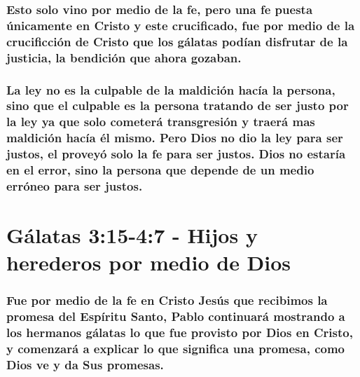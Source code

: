 \documentclass[11a pt,twoside]{article}
\let\oldsection\section
\renewcommand{\section}{\needspace{6\baselineskip}\oldsection}
\let\oldsubsubsection\subsubsection
\renewcommand{\subsubsection}{\needspace{4\baselineskip}\oldsubsubsection}
\begin{document}
\subsubsection{Esto solo vino por medio de la fe, pero una fe puesta
únicamente en Cristo y este crucificado, fue por medio de la
crucificción de Cristo que los gálatas podían disfrutar de la justicia,
la bendición que ahora
gozaban.}\label{esto-solo-vino-por-medio-de-la-fe-pero-una-fe-puesta-uxfanicamente-en-cristo-y-este-crucificado-fue-por-medio-de-la-crucificciuxf3n-de-cristo-que-los-guxe1latas-poduxedan-disfrutar-de-la-justicia-la-bendiciuxf3n-que-ahora-gozaban.}

\subsubsection{La ley no es la culpable de la maldición hacía la
persona, sino que el culpable es la persona tratando de ser justo por la
ley ya que solo cometerá transgresión y traerá mas maldición hacía él
mismo. Pero Dios no dio la ley para ser justos, el proveyó solo la fe
para ser justos. Dios no estaría en el error, sino la persona que
depende de un medio erróneo para ser
justos.}\label{la-ley-no-es-la-culpable-de-la-maldiciuxf3n-hacuxeda-la-persona-sino-que-el-culpable-es-la-persona-tratando-de-ser-justo-por-la-ley-ya-que-solo-cometeruxe1-transgresiuxf3n-y-traeruxe1-mas-maldiciuxf3n-hacuxeda-uxe9l-mismo.-pero-dios-no-dio-la-ley-para-ser-justos-el-proveyuxf3-solo-la-fe-para-ser-justos.-dios-no-estaruxeda-en-el-error-sino-la-persona-que-depende-de-un-medio-erruxf3neo-para-ser-justos.}

\section{Gálatas 3:15-4:7 - Hijos y herederos por medio de
Dios}\label{guxe1latas-315-47---hijos-y-herederos-por-medio-de-dios}

\subsubsection{Fue por medio de la fe en Cristo Jesús que recibimos la
promesa del Espíritu Santo, Pablo continuará mostrando a los hermanos
gálatas lo que fue provisto por Dios en Cristo, y comenzará a explicar
lo que significa una promesa, como Dios ve y da Sus
promesas.}\label{fue-por-medio-de-la-fe-en-cristo-jesuxfas-que-recibimos-la-promesa-del-espuxedritu-santo-pablo-continuaruxe1-mostrando-a-los-hermanos-guxe1latas-lo-que-fue-provisto-por-dios-en-cristo-y-comenzaruxe1-a-explicar-lo-que-significa-una-promesa-como-dios-ve-y-da-sus-promesas.}
\end{document}
